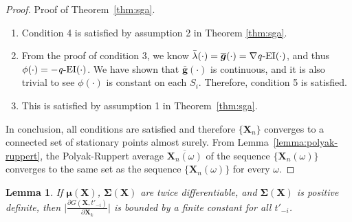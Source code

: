 \documentclass[paper=letter]{scrartcl}
\newcommand{\qEI}{\text{\textit q-EI}}
\newtheorem{lemma}{Lemma}
\begin{document}
\begin{proof}{Proof of Theorem~\ref{thm:sga}.}
\begin{enumerate}
    \item
      Condition 4 is satisfied by assumption 2 in Theorem \ref{thm:sga}.
    \item
      From the proof of condition 3, we know $\bar{\lambda}(\cdot) = \overline{\bm{g}}(\cdot) = \nabla \qEI(\cdot)$, 
      and thus $\phi(\cdot)=-\qEI(\cdot)$. We have shown that $\bar{\bm{g}}(\cdot)$ 
      is continuous, and it is also trivial to see $\phi(\cdot)$ is constant on each $S_i$.
      Therefore, condition 5 is satisfied.
    \item 
      This is satisfied by assumption 1 in Theorem~\ref{thm:sga}.
  \end{enumerate}
  In conclusion, all conditions are satisfied and therefore $\{\bm{X}_n\}$ converges 
  to a connected set of stationary points almost surely. From Lemma~\ref{lemma:polyak-ruppert}, the Polyak-Ruppert average $\overline{\bm{X}_n(\omega)}$ of the sequence $\{\bm{X}_n(\omega)\}$ converges to the same set as the sequence $\{\bm{X}_n(\omega)\}$ for every $\omega$. 
\end{proof}

\begin{lemma} \label{lemma:bound_div}
If $\bm{\mu}(\bm{X})$, $\bm{\Sigma}(\bm{X})$ are twice differentiable, and $\bm{\Sigma}(\bm{X})$ is positive definite, then $\lvert \frac{\partial G(\bm{X}, t'_{-i})}{\partial \bm{X}_k} \rvert$ is bounded by a finite constant for all $t'_{-i}$.
\end{lemma}
\end{document}
